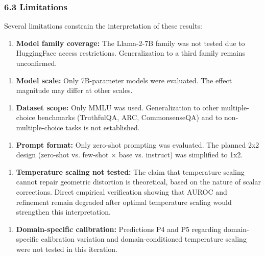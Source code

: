 \subsubsection{6.3 Limitations}

Several limitations constrain the interpretation of these results:

\begin{enumerate}
\item \textbf{Model family coverage:} The Llama-2-7B family was not tested due to HuggingFace access restrictions. Generalization to a third family remains unconfirmed.
\end{enumerate}

\begin{enumerate}
\item \textbf{Model scale:} Only 7B-parameter models were evaluated. The effect magnitude may differ at other scales.
\end{enumerate}

\begin{enumerate}
\item \textbf{Dataset scope:} Only MMLU was used. Generalization to other multiple-choice benchmarks (TruthfulQA, ARC, CommonsenseQA) and to non-multiple-choice tasks is not established.
\end{enumerate}

\begin{enumerate}
\item \textbf{Prompt format:} Only zero-shot prompting was evaluated. The planned 2x2 design (zero-shot vs. few-shot $\times$ base vs. instruct) was simplified to 1x2.
\end{enumerate}

\begin{enumerate}
\item \textbf{Temperature scaling not tested:} The claim that temperature scaling cannot repair geometric distortion is theoretical, based on the nature of scalar corrections. Direct empirical verification showing that AUROC and refinement remain degraded after optimal temperature scaling would strengthen this interpretation.
\end{enumerate}

\begin{enumerate}
\item \textbf{Domain-specific calibration:} Predictions P4 and P5 regarding domain-specific calibration variation and domain-conditioned temperature scaling were not tested in this iteration.
\end{enumerate}

